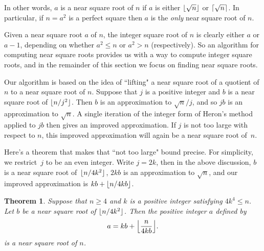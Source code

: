 \documentclass[a4paper]{article}
\DeclarePairedDelimiter\floor{\lfloor}{\rfloor}
\DeclarePairedDelimiter\ceil{\lceil}{\rceil}
\theoremstyle{plain}
\newtheorem{theorem}{Theorem}
\theoremstyle{definition}
\begin{document}
In other words, $a$ is a near square root of $n$ if $a$ is either $\floor{\sqrt
n}$ or $\ceil{\sqrt n}$. In particular, if $n = a^2$ is a perfect square then
$a$ is the \emph{only} near square root of $n$.

Given a near square root $a$ of $n$, the integer square root of $n$ is clearly
either $a$ or $a-1$, depending on whether $a^2 \le n$ or $a^2 > n$
(respectively). So an algorithm for computing near square roots provides us
with a way to compute integer square roots, and in the remainder of this
section we focus on finding near square roots.

Our algorithm is based on the idea of ``lifting" a near square root of a
quotient of $n$ to a near square root of $n$. Suppose that $j$ is a positive
integer and $b$ is a near square root of $\floor{n / j^2}$. Then $b$ is an
approximation to $\sqrt n / j$, and so $jb$ is an approximation to $\sqrt n$. A
single iteration of the integer form of Heron's method applied to $jb$ then
gives an improved approximation. If $j$ is not too large with respect to $n$,
this improved approximation will again be a near square root of~$n$.

Here's a theorem that makes that ``not too large" bound precise. For
simplicity, we restrict~$j$ to be an even integer. Write $j = 2k$, then in the
above discussion, $b$ is a near square root of~$\floor{n / 4k^2}$, $2kb$ is an
approximation to $\sqrt n$, and our improved approximation is $kb + \floor{n /
4kb}$.

\begin{theorem}\label{main_theorem}
  Suppose that $n \ge 4$ and $k$ is a positive integer satisfying $4k^4 \le
  n$. Let $b$ be a near square root of $\floor{n / 4k^2}$. Then the positive
  integer $a$ defined by
  $$ a = kb + \floor*{\frac{n}{4kb}}. $$
  is a near square root of $n$.
\end{theorem}
\end{document}
